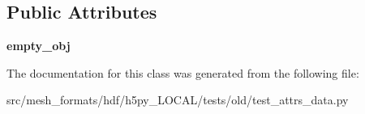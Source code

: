 \subsection*{Public Attributes}
\begin{DoxyCompactItemize}
\item 
\mbox{\label{classh5py__LOCAL_1_1tests_1_1old_1_1test__attrs__data_1_1TestEmpty_aca4f9ed57be017d7e01b682e24d71726}} 
{\bfseries empty\+\_\+obj}
\end{DoxyCompactItemize}


The documentation for this class was generated from the following file\+:\begin{DoxyCompactItemize}
\item 
src/mesh\+\_\+formats/hdf/h5py\+\_\+\+L\+O\+C\+A\+L/tests/old/test\+\_\+attrs\+\_\+data.\+py\end{DoxyCompactItemize}
